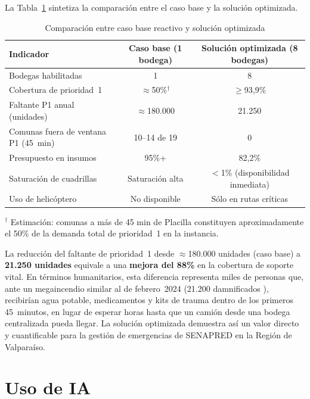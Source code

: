 \documentclass[letterpaper]{article}
\begin{document}
\begin{flushleft}
La Tabla~\ref{tab:comparacion} sintetiza la comparaci\'on entre el caso base y la soluci\'on optimizada.

\begin{table}[H]
\centering
\caption{Comparaci\'on entre caso base reactivo y soluci\'on optimizada}
\label{tab:comparacion}
\begin{tabular}{lcc}
\hline
\textbf{Indicador} & \textbf{Caso base (1 bodega)} & \textbf{Soluci\'on optimizada (8 bodegas)} \\
\hline
Bodegas habilitadas                     & 1            & 8 \\
Cobertura de prioridad~1                & $\approx$50\%$^\dagger$ & $\geq$93{,}9\% \\
Faltante P1 anual (unidades)            & $\approx$180.000 & 21.250 \\
Comunas fuera de ventana P1 (45~min)    & 10--14 de 19 & 0 \\
Presupuesto en insumos                  & 95\%+        & 82{,}2\% \\
Saturaci\'on de cuadrillas              & Saturaci\'on alta & $<$1\% (disponibilidad inmediata) \\
Uso de helic\'optero                    & No disponible & S\'olo en rutas cr\'iticas \\
\hline
\end{tabular}
\end{table}
{\small $^\dagger$ Estimaci\'on: comunas a m\'as de 45 min de Placilla constituyen aproximadamente el 50\% de la demanda total de prioridad~1 en la instancia.}

La reducci\'on del faltante de prioridad~1 desde $\approx$180.000 unidades (caso base) a \textbf{21.250 unidades} equivale a una \textbf{mejora del 88\%} en la cobertura de soporte vital. En t\'erminos humanitarios, esta diferencia representa miles de personas que, ante un megaincendio similar al de febrero~2024 (21.200 damnificados \cite{minds2024plan}), recibir\'ian agua potable, medicamentos y kits de trauma dentro de los primeros 45~minutos, en lugar de esperar horas hasta que un cami\'on desde una bodega centralizada pueda llegar. La soluci\'on optimizada demuestra as\'i un valor directo y cuantificable para la gesti\'on de emergencias de SENAPRED en la Regi\'on de Valpara\'iso.

\section{Uso de IA}


\end{flushleft}
\end{document}
